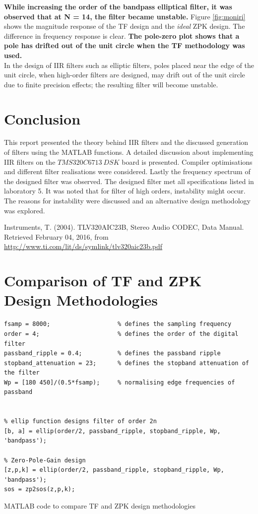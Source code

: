 \documentclass{article}
\begin{document}
\textbf{While increasing the order of the bandpass elliptical filter, it was observed that at N = 14, the filter became unstable.} Figure \ref{fig:moniri} shows the magnitude response of the TF design and the \textit{ideal} ZPK design. The difference in frequency response is clear. \textbf{The pole-zero plot shows that a pole has drifted out of the unit circle when the TF methodology was used.}\\

In the design of IIR filters such as elliptic filters, poles placed near the edge of the unit circle, when high-order filters are designed, may drift out of the unit circle due to finite precision effects; the resulting filter will become unstable.

\section{Conclusion}
This report presented the theory behind IIR filters and the discussed generation of filters using the MATLAB functions. A detailed discussion about implementing IIR filters on the $TMS320C6713 \ DSK$ board is presented. Compiler optimisations and different filter realisations were considered. Lastly the frequency spectrum of the designed filter was observed. The designed filter met all specifications listed in laboratory 5. It was noted that for filter of high orders, instability might occur. The reasons for instability were discussed and an alternative design methodology was explored. 

\begin{thebibliography}{99}
 Instruments, T. (2004). TLV320AIC23B, Stereo Audio CODEC, Data Manual. Retrieved February 04, 2016, from \url{http://www.ti.com/lit/ds/symlink/tlv320aic23b.pdf}
\end{thebibliography}

\newpage
\appendix
\section{Comparison of TF and ZPK Design Methodologies}
\begin{listing}[H]
\begin{verbatim}
fsamp = 8000;                   % defines the sampling frequency
order = 4;                      % defines the order of the digital filter
passband_ripple = 0.4;          % defines the passband ripple
stopband_attenuation = 23;      % defines the stopband attenuation of the filter
Wp = [180 450]/(0.5*fsamp);     % normalising edge frequencies of passband


% ellip function designs filter of order 2n
[b, a] = ellip(order/2, passband_ripple, stopband_ripple, Wp, 'bandpass');

% Zero-Pole-Gain design
[z,p,k] = ellip(order/2, passband_ripple, stopband_ripple, Wp, 'bandpass');
sos = zp2sos(z,p,k);
\end{verbatim}
\caption{MATLAB code to compare TF and ZPK design methodologies} 
\label{lst:MATLAB_elliptical}
\end{listing}
\end{document}
